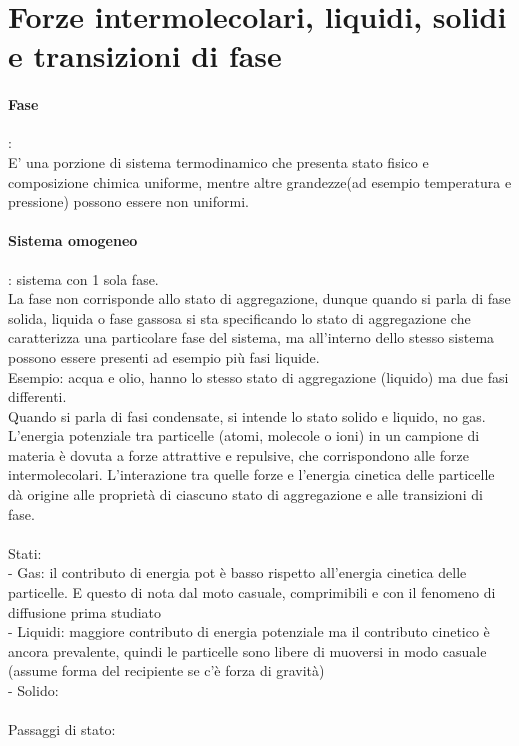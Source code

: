 \section{Forze intermolecolari, liquidi, solidi e transizioni di fase}
\paragraph*{Fase}:\\
E' una porzione di sistema termodinamico che presenta stato fisico e composizione chimica uniforme, mentre altre grandezze(ad esempio temperatura e pressione) possono essere non uniformi.\
\paragraph*{Sistema omogeneo}: sistema con 1 sola fase.\\
La fase non corrisponde allo stato di aggregazione, dunque quando si parla di fase solida, liquida o fase gassosa si sta specificando lo stato di aggregazione che caratterizza una particolare fase del sistema, ma all’interno dello stesso sistema possono essere presenti ad esempio più fasi liquide.\\
Esempio: acqua e olio, hanno lo stesso stato di aggregazione (liquido) ma due fasi differenti. \\
Quando si parla di fasi condensate, si intende lo stato solido e liquido, no gas.\\
L’energia potenziale tra particelle (atomi, molecole o ioni) in un campione di materia è dovuta a forze attrattive e repulsive, che corrispondono alle forze intermolecolari. L’interazione tra quelle forze e l’energia cinetica delle particelle dà origine alle proprietà di ciascuno stato di aggregazione e alle transizioni di fase.\\\\
Stati: \\
\tab- Gas: il contributo di energia pot è basso rispetto all’energia cinetica delle particelle. E questo di nota dal moto casuale, comprimibili e con il fenomeno di diffusione prima studiato\\
\tab- Liquidi: maggiore contributo di energia potenziale ma il contributo cinetico è ancora prevalente, quindi le particelle sono libere di muoversi in modo casuale (assume forma del recipiente se c’è forza di gravità)\\
\tab- Solido:\\\\
Passaggi di stato:\\
